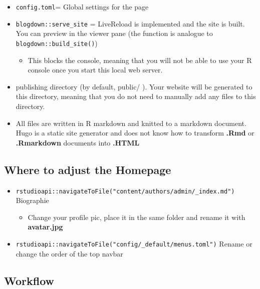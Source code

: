 \documentclass[
]{article}
\providecommand{\tightlist}{%
  \setlength{\itemsep}{0pt}\setlength{\parskip}{0pt}}
\begin{document}
\begin{itemize}
\tightlist
\item
  \texttt{config.toml}= Global settings for the page
\item
  \texttt{blogdown::serve\_site} = LiveReload is implemented and the site is
  built. You can preview in the viewer pane (the function is analogue
  to \texttt{blogdown::build\_site()})

  \begin{itemize}
  \tightlist
  \item
    This blocks the console, meaning that you will not be able to
    use your R console once you start this local web server.
  \end{itemize}
\item
  publishing directory (by default, public/ ). Your website will
  be generated to this directory, meaning that you do not need to
  manually add any files to this directory.
\item
  All files are written in R markdown and knitted to a markdown
  document. Hugo is a static site generator and does not know how to
  transform \textbf{.Rmd} or \textbf{.Rmarkdown} documents into \textbf{.HTML}
\end{itemize}

\hypertarget{where-to-adjust-the-homepage}{%
\subsection{Where to adjust the Homepage}\label{where-to-adjust-the-homepage}}

\begin{itemize}
\tightlist
\item
  \texttt{rstudioapi::navigateToFile("content/authors/admin/\_index.md")}
  Biographie

  \begin{itemize}
  \tightlist
  \item
    Change your profile pic, place it in the same folder and rename
    it with \textbf{avatar.jpg}
  \end{itemize}
\item
  \texttt{rstudioapi::navigateToFile("config/\_default/menus.toml")} Rename or
  change the order of the top navbar
\end{itemize}

\hypertarget{workflow}{%
\subsection{Workflow}\label{workflow}}
\end{document}
